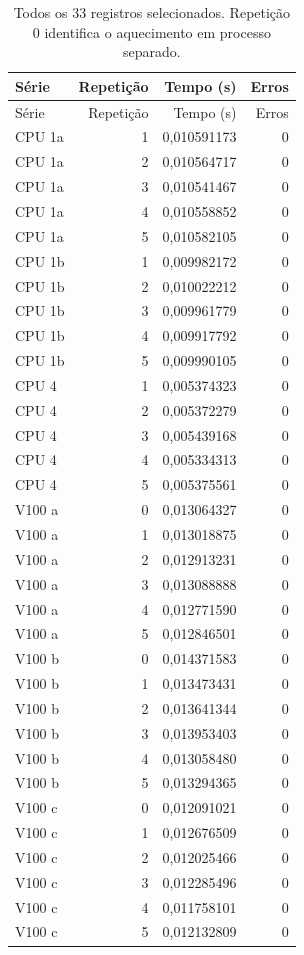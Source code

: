 \begin{longtable}{lrrr}
\caption{Todos os 33 registros selecionados. Repetição 0 identifica o aquecimento em processo separado.}\label{tab:brutos}\\
\toprule Série & Repetição & Tempo (s) & Erros\\
\midrule\endfirsthead
\toprule Série & Repetição & Tempo (s) & Erros\\
\midrule\endhead
\bottomrule\endfoot
CPU 1a & 1 & 0,010591173 & 0\\
CPU 1a & 2 & 0,010564717 & 0\\
CPU 1a & 3 & 0,010541467 & 0\\
CPU 1a & 4 & 0,010558852 & 0\\
CPU 1a & 5 & 0,010582105 & 0\\
CPU 1b & 1 & 0,009982172 & 0\\
CPU 1b & 2 & 0,010022212 & 0\\
CPU 1b & 3 & 0,009961779 & 0\\
CPU 1b & 4 & 0,009917792 & 0\\
CPU 1b & 5 & 0,009990105 & 0\\
CPU 4 & 1 & 0,005374323 & 0\\
CPU 4 & 2 & 0,005372279 & 0\\
CPU 4 & 3 & 0,005439168 & 0\\
CPU 4 & 4 & 0,005334313 & 0\\
CPU 4 & 5 & 0,005375561 & 0\\
V100 a & 0 & 0,013064327 & 0\\
V100 a & 1 & 0,013018875 & 0\\
V100 a & 2 & 0,012913231 & 0\\
V100 a & 3 & 0,013088888 & 0\\
V100 a & 4 & 0,012771590 & 0\\
V100 a & 5 & 0,012846501 & 0\\
V100 b & 0 & 0,014371583 & 0\\
V100 b & 1 & 0,013473431 & 0\\
V100 b & 2 & 0,013641344 & 0\\
V100 b & 3 & 0,013953403 & 0\\
V100 b & 4 & 0,013058480 & 0\\
V100 b & 5 & 0,013294365 & 0\\
V100 c & 0 & 0,012091021 & 0\\
V100 c & 1 & 0,012676509 & 0\\
V100 c & 2 & 0,012025466 & 0\\
V100 c & 3 & 0,012285496 & 0\\
V100 c & 4 & 0,011758101 & 0\\
V100 c & 5 & 0,012132809 & 0\\
\end{longtable}

